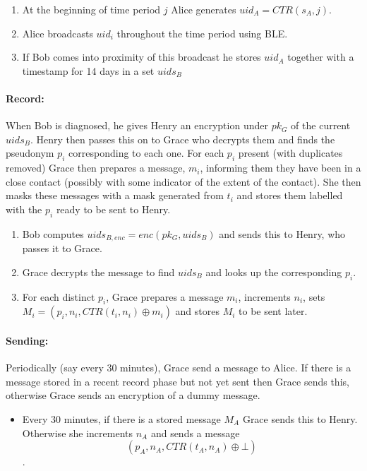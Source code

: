 \documentclass{article}
\begin{document}
\begin{enumerate}
    \item At the beginning of time period $j$ Alice generates $uid_A=\mathit{CTR}(s_A,j)$.
    \item Alice broadcasts $uid_i$ throughout the time period using BLE.
    \item If Bob comes into proximity of this broadcast he stores $uid_A$ together with a timestamp for 14 days in a set $uids_B$
\end{enumerate}

\paragraph{Record:}
When Bob is diagnosed, he gives Henry an encryption under $pk_G$ of the current $uids_B$. Henry then passes this on to Grace who decrypts them and finds the pseudonym $p_i$ corresponding to each one. For each $p_i$ present (with duplicates removed) Grace then prepares a message, $m_i$, informing them they have been in a close contact (possibly with some indicator of the extent of the contact). She then masks these messages with a mask generated from $t_i$ and stores them labelled with the $p_i$ ready to be sent to Henry.

\begin{enumerate}
    \item Bob computes $uids_{B, enc} = enc(pk_G, uids_B)$ and sends this to Henry, who passes it to Grace.
    \item Grace decrypts the message to find $uids_B$ and looks up the corresponding $p_i$.
    \item For each distinct $p_i$, Grace prepares a message $m_i$, increments $n_i$, sets $M_i = (p_i,n_i, \mathit{CTR}(t_i,n_i) \oplus m_i)$ and stores $M_i$ to be sent later.
\end{enumerate}

\paragraph{Sending:}
Periodically (say every 30 minutes), Grace send a message to Alice. If there is a message stored in a recent record phase but not yet sent then Grace sends this, otherwise Grace sends an encryption of a dummy message.

\begin{itemize}
    \item Every 30 minutes, if there is a stored message $M_A$ Grace sends this to Henry. Otherwise she increments $n_A$ and sends a message $$(p_A,n_A, \mathit{CTR}(t_A,n_A) \oplus \bot)$$.
\end{itemize}
\end{document}
